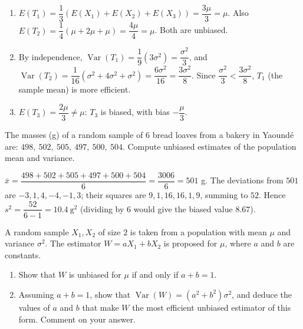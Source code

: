 \documentclass[11pt]{article}
\begin{document}
\begin{corrige}[Exercise 1]
\begin{enumerate}
\item $E(T_{1}) = \dfrac{1}{3}(E(X_{1})+E(X_{2})+E(X_{3})) = \dfrac{3\mu}{3} = \mu$. Also $E(T_{2}) = \dfrac{1}{4}(\mu + 2\mu + \mu) = \dfrac{4\mu}{4} = \mu$. Both are unbiased.
\item By independence, $\operatorname{Var}(T_{1}) = \dfrac{1}{9}(3\sigma^{2}) = \dfrac{\sigma^{2}}{3}$, and $\operatorname{Var}(T_{2}) = \dfrac{1}{16}(\sigma^{2} + 4\sigma^{2} + \sigma^{2}) = \dfrac{6\sigma^{2}}{16} = \dfrac{3\sigma^{2}}{8}$. Since $\dfrac{\sigma^{2}}{3} < \dfrac{3\sigma^{2}}{8}$, $T_{1}$ (the sample mean) is more efficient.
\item $E(T_{3}) = \dfrac{2\mu}{3} \neq \mu$: $T_{3}$ is biased, with bias $-\dfrac{\mu}{3}$.
\end{enumerate}
\end{corrige}

\begin{exercice}
The masses (g) of a random sample of $6$ bread loaves from a bakery in Yaound\'e are: $498,\ 502,\ 505,\ 497,\ 500,\ 504$. Compute unbiased estimates of the population mean and variance.
\end{exercice}

\begin{corrige}[Exercise 2]
$\bar{x} = \dfrac{498+502+505+497+500+504}{6} = \dfrac{3006}{6} = 501$ g. The deviations from $501$ are $-3, 1, 4, -4, -1, 3$; their squares are $9, 1, 16, 16, 1, 9$, summing to $52$. Hence $s^{2} = \dfrac{52}{6-1} = 10.4\ \mathrm{g}^{2}$ (dividing by $6$ would give the biased value $8.67$).
\end{corrige}

\begin{exercice}
A random sample $X_{1}, X_{2}$ of size $2$ is taken from a population with mean $\mu$ and variance $\sigma^{2}$. The estimator $W = aX_{1} + bX_{2}$ is proposed for $\mu$, where $a$ and $b$ are constants.
\begin{enumerate}
\item Show that $W$ is unbiased for $\mu$ if and only if $a + b = 1$.
\item Assuming $a + b = 1$, show that $\operatorname{Var}(W) = (a^{2} + b^{2})\sigma^{2}$, and deduce the values of $a$ and $b$ that make $W$ the most efficient unbiased estimator of this form. Comment on your answer.
\end{enumerate}
\end{exercice}
\end{document}
